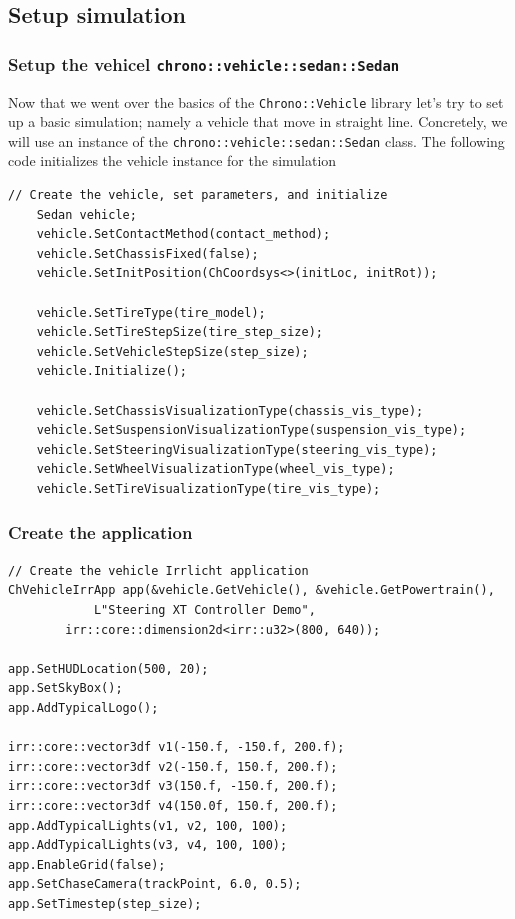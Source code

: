 \subsection{Setup simulation}

\subsubsection{Setup the vehicel \lstinline{chrono::vehicle::sedan::Sedan}}

Now that we went over the basics of the \lstinline{Chrono::Vehicle} library let's try to set up a basic simulation; namely a vehicle that move in straight line.
Concretely, we will use an instance of the \lstinline{chrono::vehicle::sedan::Sedan} class. The following code initializes the vehicle instance for the simulation

\begin{lstlisting}
// Create the vehicle, set parameters, and initialize
    Sedan vehicle;
    vehicle.SetContactMethod(contact_method);
    vehicle.SetChassisFixed(false);
    vehicle.SetInitPosition(ChCoordsys<>(initLoc, initRot));
    
    vehicle.SetTireType(tire_model);
    vehicle.SetTireStepSize(tire_step_size);
    vehicle.SetVehicleStepSize(step_size);
    vehicle.Initialize();

    vehicle.SetChassisVisualizationType(chassis_vis_type);
    vehicle.SetSuspensionVisualizationType(suspension_vis_type);
    vehicle.SetSteeringVisualizationType(steering_vis_type);
    vehicle.SetWheelVisualizationType(wheel_vis_type);
    vehicle.SetTireVisualizationType(tire_vis_type);
\end{lstlisting}


\subsubsection{Create the application}

\begin{lstlisting}
// Create the vehicle Irrlicht application
ChVehicleIrrApp app(&vehicle.GetVehicle(), &vehicle.GetPowertrain(), 
		    L"Steering XT Controller Demo", 
        irr::core::dimension2d<irr::u32>(800, 640));

app.SetHUDLocation(500, 20);
app.SetSkyBox();
app.AddTypicalLogo();

irr::core::vector3df v1(-150.f, -150.f, 200.f);
irr::core::vector3df v2(-150.f, 150.f, 200.f);
irr::core::vector3df v3(150.f, -150.f, 200.f);
irr::core::vector3df v4(150.0f, 150.f, 200.f); 
app.AddTypicalLights(v1, v2, 100, 100);
app.AddTypicalLights(v3, v4, 100, 100);
app.EnableGrid(false);
app.SetChaseCamera(trackPoint, 6.0, 0.5);
app.SetTimestep(step_size);
\end{lstlisting}


